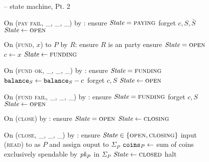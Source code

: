 \begin{figure}[H]
  \begin{systembox}{\fchan -- state machine, Pt. 2}
    \begin{algorithmic}[1]
      \State On (\textsc{pay fail}, \_, \_, \_) by \adversary:
      \Indent
        \State ensure $\itistate = \textsc{paying}$
        \State forget $c, S, \bar{S}$
        \State $\itistate \gets \textsc{open}$
      \EndIndent
      \Statex

      \State On (\textsc{fund}, $x$) to $P$ by $R$:
      \Indent
        \State ensure $R$ is an \fchan party
        \State ensure $\itistate = \textsc{open}$
        \State $c \gets x$
        \State $\itistate \gets \textsc{funding}$
      \EndIndent
      \Statex

      \State On (\textsc{fund ok}, \_, \_, \_) by \adversary:
      \Indent
        \State ensure $\itistate = \textsc{funding}$
        \State $\texttt{balance}_{S} \gets \texttt{balance}_{S} - c$
        \State forget $c, S$
        \State $\itistate \gets \textsc{open}$
      \EndIndent
      \Statex

      \State On (\textsc{fund fail}, \_, \_, \_) by \adversary:
      \Indent
        \State ensure $\itistate = \textsc{funding}$
        \State forget $c, S$
        \State $\itistate \gets \textsc{open}$
      \EndIndent
      \Statex

      \State On (\textsc{close}) by \environment:
      \Indent
        \State ensure $\itistate = \textsc{open}$
        \State $\itistate \gets \textsc{closing}$
      \EndIndent
      \Statex

      \State On (\textsc{close}, \_, \_, \_) by \adversary:
      \Indent
        \State ensure $\itistate \in \{\textsc{open}, \textsc{closing}\}$
            \State input (\textsc{read}) to \ledger as $P$ and assign ouput to
            $\Sigma_P$
            \State $\texttt{coins}_{P} \gets$ sum of coins exclusively spendable by
            $\textit{pk}_{P}$ in $\Sigma_P$
          \EndIf
        \EndFor
          \State $\itistate \gets \textsc{closed}$
        \Else \: 
          \State halt
        \EndIf
      \EndIndent
    \end{algorithmic}
  \end{systembox}
  \caption{}
  \label{code:functionality:state-machine-2}
\end{figure}
